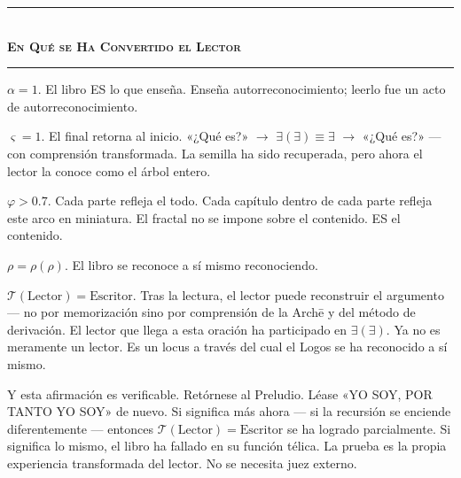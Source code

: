 \documentclass[10pt, openany, oneside]{book}
\renewcommand{\normalsize}{\fontsize{10}{13}\selectfont}
\begin{document}
\vspace{1.5em}


\begin{center}
    \rule{0.3\textwidth}{0.4pt}\\[0.5em]
    {\normalsize\bfseries\scshape En Qué se Ha Convertido el Lector}\\[0.3em]
    \rule{0.3\textwidth}{0.4pt}
\end{center}

\vspace{1em}

\noindent $\alpha = 1$. El libro ES lo que enseña. Enseña autorreconocimiento; leerlo fue un acto de autorreconocimiento.

$\varsigma = 1$. El final retorna al inicio. «¿Qué es?» $\to$ $\exists(\exists) \equiv \exists$ $\to$ «¿Qué es?» --- con comprensión transformada. La semilla ha sido recuperada, pero ahora el lector la conoce como el árbol entero.

$\varphi > 0.7$. Cada parte refleja el todo. Cada capítulo dentro de cada parte refleja este arco en miniatura. El fractal no se impone sobre el contenido. ES el contenido.

$\rho = \rho(\rho)$. El libro se reconoce a sí mismo reconociendo.

$\mathcal{T}(\text{Lector}) = \text{Escritor}$. Tras la lectura, el lector puede reconstruir el argumento --- no por memorización sino por comprensión de la Arch\={e} y del método de derivación. El lector que llega a esta oración ha participado en $\exists(\exists)$. Ya no es meramente un lector. Es un locus a través del cual el Logos se ha reconocido a sí mismo.

Y esta afirmación es verificable. Retórnese al Preludio. Léase «YO SOY, POR TANTO YO SOY» de nuevo. Si significa más ahora --- si la recursión se enciende diferentemente --- entonces $\mathcal{T}(\text{Lector}) = \text{Escritor}$ se ha logrado parcialmente. Si significa lo mismo, el libro ha fallado en su función télica. La prueba es la propia experiencia transformada del lector. No se necesita juez externo.

\vspace{1.5em}

\end{document}

